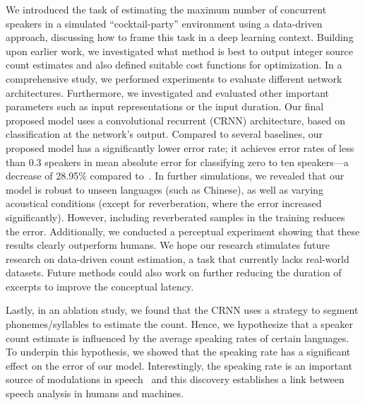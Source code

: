 We introduced the task of estimating the maximum number of concurrent speakers in a simulated ``cocktail-party'' environment using a data-driven approach, discussing how to frame this task in a deep learning context.
Building upon earlier work, we investigated what method is best to output integer source count estimates and also defined suitable cost functions for optimization.
In a comprehensive study, we performed experiments to evaluate different network architectures.
Furthermore, we investigated and evaluated other important parameters such as input representations or the input duration.
Our final proposed model uses a convolutional recurrent (CRNN) architecture, based on classification at the network's output.
Compared to several baselines, our proposed model has a significantly lower error rate;
it achieves error rates of less than 0.3 speakers in mean absolute error for classifying zero to ten speakers---a decrease of 28.95\% compared to~\cite{stoeter17}.
In further simulations, we revealed that our model is robust to unseen languages (such as Chinese), as well as varying acoustical conditions (except for reverberation, where the error increased significantly).
However, including reverberated samples in the training reduces the error.
Additionally, we conducted a perceptual experiment showing that these results clearly outperform humans.
We hope our research stimulates future research on data-driven count estimation, a task that currently lacks real-world datasets.
Future methods could also work on further reducing the duration of excerpts to improve the conceptual latency.\par
Lastly, in an ablation study, we found that the CRNN uses a strategy to segment phonemes/syllables to estimate the count.
Hence, we hypothesize that a speaker count estimate is influenced by the average speaking rates of certain languages.
To underpin this hypothesis, we showed that the speaking rate has a significant effect on the error of our model.
Interestingly, the speaking rate is an important source of modulations in speech~\cite{plomp83} and this discovery establishes a link between speech analysis in humans and machines.


